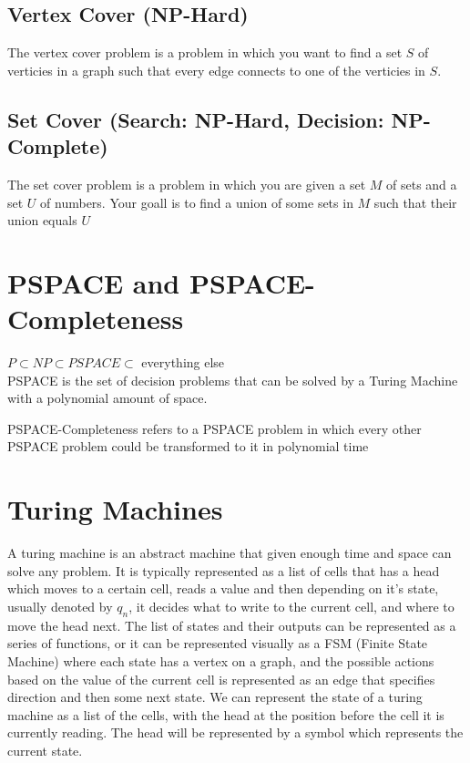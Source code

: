 \documentclass{article}
\begin{document}
\subsection{Vertex Cover (NP-Hard)}
The vertex cover problem is a problem in which you want to find a set $S$ of verticies in a graph such that
every edge connects to one of the verticies in $S$.

\subsection{Set Cover (Search: NP-Hard, Decision: NP-Complete)}
The set cover problem is a problem in which you are given a set $M$ of sets and a set $U$ of numbers. Your
goall is to find a union of some sets in $M$ such that their union equals $U$

\section{PSPACE and PSPACE-Completeness}
$P \subset NP \subset PSPACE \subset $ everything else\\
PSPACE is the set of decision problems that can be solved by a Turing Machine with a polynomial amount of
space. 

PSPACE-Completeness refers to a PSPACE problem in which every other PSPACE problem could be transformed to it in 
polynomial time

\section{Turing Machines}
A turing machine is an abstract machine that given enough time and space can solve any problem. It
is typically represented as a list of cells that has a head which moves to a certain cell, reads a value
and then depending on it's state, usually denoted by $q_n$, it decides what to write to the current cell,
and where to move the head next. The list of states and their outputs can be represented as a series of functions, 
or it can be represented visually as a FSM (Finite State Machine) where each state has a vertex on a graph, and the
possible actions based on the value of the current cell is represented as an edge that specifies direction and then 
some next state. We can represent the state of a turing machine as a list of the cells, with the head at the position
before the cell it is currently reading. The head will be represented by a symbol which represents the current state.
\end{document}
